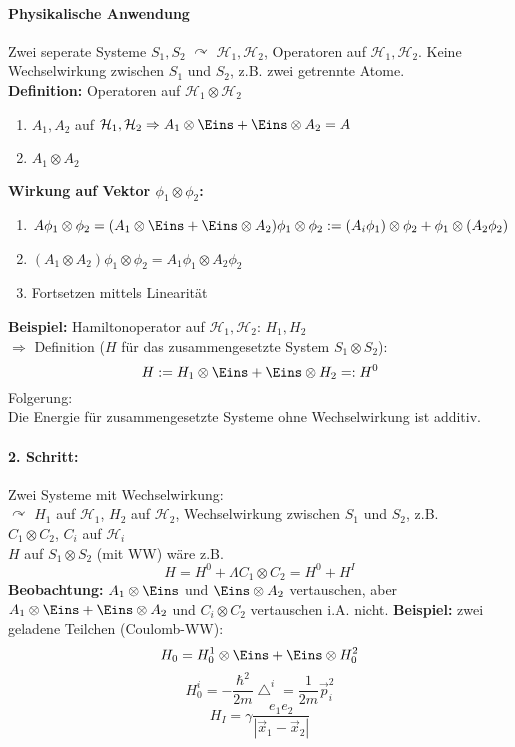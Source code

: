 \documentclass[twoside,a4paper]{scrartcl}
\renewcommand{\1}{\mathds{1}}
\begin{document}
\paragraph{Physikalische Anwendung}
Zwei seperate Systeme $S_1,S_2$ $\curvearrowright$ $\mathcal H_1,\mathcal H_2$, Operatoren auf $\mathcal H_1, \mathcal H_2$. Keine Wechselwirkung zwischen $S_1$ und $S_2$, z.B. zwei getrennte Atome.\\
\textbf{Definition:} Operatoren auf $\mathcal H_1 \otimes \mathcal H_2$
\begin{enumerate}
 \item $A_1,A_2$ auf $\mathcal H_1, \mathcal H_2 \Rightarrow A_1 \otimes \Eins+\Eins \otimes A_2=A$ 
 \item $A_1 \otimes A_2$
\end{enumerate}
\textbf{Wirkung auf Vektor $\phi_1 \otimes \phi_2$:}\\
\begin{enumerate}
 \item $A\phi_1 \otimes \phi_2=(A_1 \otimes \Eins+\Eins \otimes A_2)\phi_1 \otimes \phi_2:= (A_i \phi_1)\otimes \phi_2 +\phi_1 \otimes (A_2 \phi_2)$ 
 \item $(A_1 \otimes A_2)\phi_1 \otimes \phi_2=A_1\phi_1 \otimes A_2\phi_2$
 \item Fortsetzen mittels Linearität
\end{enumerate}
\textbf{Beispiel:}
Hamiltonoperator auf $\mathcal H_1, \mathcal H_2$: $H_1,H_2$\\
$\Rightarrow$ Definition ($H$ für das zusammengesetzte System $S_1 \otimes S_2$): \\
$$H:=H_1 \otimes \Eins + \Eins \otimes H_2=:H^0$$
Folgerung:\\
Die Energie für zusammengesetzte Systeme ohne Wechselwirkung ist additiv.

\paragraph{2. Schritt:} Zwei Systeme mit Wechselwirkung:\\
$\curvearrowright$ $H_1$ auf $\mathcal H_1$, $H_2$ auf $\mathcal H_2$, Wechselwirkung zwischen $S_1$ und $S_2$, z.B. \\
$C_1 \otimes C_2$, $C_i$ auf $\mathcal H_i$\\
$H$ auf $S_1 \otimes S_2$ (mit WW) wäre z.B. 
$$H=H^0+ \Lambda C_1 \otimes C_2=H^0+H^I$$
\textbf{Beobachtung:}
$A_1\otimes \Eins$ und $\Eins \otimes A_2$ vertauschen, aber $A_1 \otimes \Eins + \Eins \otimes A_2$ und $C_i \otimes C_2$ vertauschen i.A. nicht.
\textbf{Beispiel:} zwei geladene Teilchen (Coulomb-WW):\\
$$H_0=H_0^1\otimes \Eins +\Eins \otimes H_0^2$$
$$H_0^i=-\frac{\hbar^2}{2m}\bigtriangleup^i=\frac{1}{2m}\vec p^2_i$$
$$H_I=\gamma \frac{e_1 e_2}{|\vec x_1-\vec x_2|}$$
\end{document}
